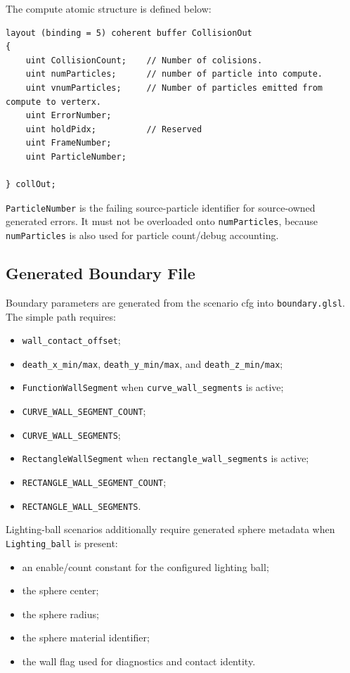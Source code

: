 The compute atomic structure is defined below:
\begin{verbatim}
layout (binding = 5) coherent buffer CollisionOut
{
	uint CollisionCount; 	// Number of colisions.
	uint numParticles;		// number of particle into compute.
	uint vnumParticles; 	// Number of particles emitted from compute to verterx.
	uint ErrorNumber;
	uint holdPidx;			// Reserved
	uint FrameNumber;
	uint ParticleNumber;

} collOut;
\end{verbatim}

\texttt{ParticleNumber} is the failing source-particle identifier for
source-owned generated errors.  It must not be overloaded onto
\texttt{numParticles}, because \texttt{numParticles} is also used for particle
count/debug accounting.

\subsection{Generated Boundary File}

Boundary parameters are generated from the scenario cfg into
\texttt{boundary.glsl}.  The simple path requires:
\begin{itemize}
    \item \texttt{wall\_contact\_offset};
    \item \texttt{death\_x\_min/max},
          \texttt{death\_y\_min/max}, and
          \texttt{death\_z\_min/max};
    \item \texttt{FunctionWallSegment} when
          \texttt{curve\_wall\_segments} is active;
    \item \texttt{CURVE\_WALL\_SEGMENT\_COUNT};
    \item \texttt{CURVE\_WALL\_SEGMENTS};
    \item \texttt{RectangleWallSegment} when
          \texttt{rectangle\_wall\_segments} is active;
    \item \texttt{RECTANGLE\_WALL\_SEGMENT\_COUNT};
    \item \texttt{RECTANGLE\_WALL\_SEGMENTS}.
\end{itemize}

Lighting-ball scenarios additionally require generated sphere metadata when
\texttt{Lighting\_ball} is present:
\begin{itemize}
    \item an enable/count constant for the configured lighting ball;
    \item the sphere center;
    \item the sphere radius;
    \item the sphere material identifier;
    \item the wall flag used for diagnostics and contact identity.
\end{itemize}

